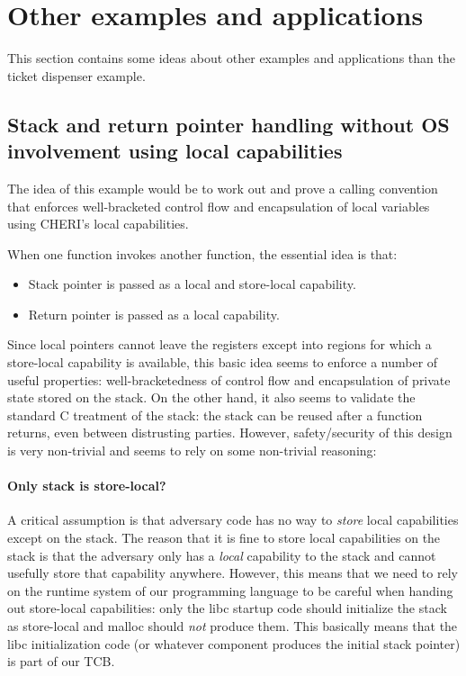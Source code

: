 \documentclass{article}
\begin{document}
\section{Other examples and applications}
\label{sec:other_apps}
This section contains some ideas about other examples and applications than the
ticket dispenser example.

\subsection{Stack and return pointer handling without OS involvement using local
  capabilities}
The idea of this example would be to work out and prove a calling convention
that enforces well-bracketed control flow and encapsulation of local variables
using CHERI's local capabilities.

When one function invokes another function, the essential idea is that:
\begin{itemize}
\item Stack pointer is passed as a local and store-local capability.
\item Return pointer is passed as a local capability.
\end{itemize}

Since local pointers cannot leave the registers except into regions for which a
store-local capability is available, this basic idea seems to enforce a number
of useful properties: well-bracketedness of control flow and encapsulation of
private state stored on the stack. On the other hand, it also seems to validate
the standard C treatment of the stack: the stack can be reused after a function
returns, even between distrusting parties. However, safety/security of this
design is very non-trivial and seems to rely on some non-trivial reasoning:

\paragraph{Only stack is store-local?}
A critical assumption is that adversary code has no way to \emph{store} local
capabilities except on the stack. The reason that it is fine to store local
capabilities on the stack is that the adversary only has a \emph{local}
capability to the stack and cannot usefully store that capability anywhere.
However, this means that we need to rely on the runtime system of our
programming language to be careful when handing out store-local capabilities:
only the libc startup code should initialize the stack as store-local and malloc
should \emph{not} produce them. This basically means that the libc
initialization code (or whatever component produces the initial stack pointer)
is part of our TCB.
\end{document}
